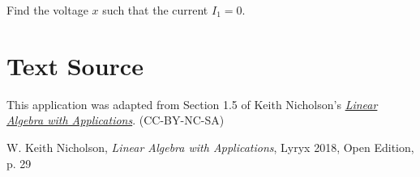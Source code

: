 \documentclass{ximera}
\begin{document}
\begin{problem}

Find the voltage $x$ such that the current $I_1 = 0$.

%
\end{problem}

\section*{Text Source} This application was adapted from Section 1.5 of Keith Nicholson's \href{https://open.umn.edu/opentextbooks/textbooks/linear-algebra-with-applications}{\it Linear Algebra with Applications}. (CC-BY-NC-SA)

W. Keith Nicholson, {\it Linear Algebra with Applications}, Lyryx 2018, Open Edition, p. 29 
\end{document}
